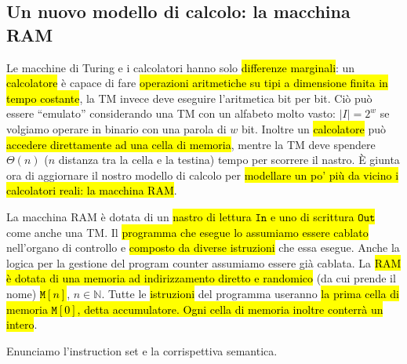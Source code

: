 \documentclass[a4paper,11pt,oneside]{article}
\theoremstyle{plain}
\theoremstyle{definition}
\theoremstyle{remark}
\begin{document}
\subsection{Un nuovo modello di calcolo: la macchina RAM}\label{sec:ram}

Le macchine di Turing e i calcolatori hanno solo \hl{differenze marginali}: un
\hl{calcolatore} è capace di fare \hl{operazioni aritmetiche su tipi a
dimensione finita in tempo costante}, la TM invece deve eseguire l'aritmetica
bit per bit. Ciò può essere ``emulato'' considerando una TM con un alfabeto
molto vasto: $|I| = 2^w$ se volgiamo operare in binario con una parola di $w$
bit. Inoltre un \hl{calcolatore} può \hl{accedere direttamente ad una cella di
memoria}, mentre la TM deve spendere $\Theta(n)$ ($n$ distanza tra la cella e la
testina) tempo per scorrere il nastro. È giunta ora di aggiornare il nostro
modello di calcolo per \hl{modellare un po' più da vicino i calcolatori reali:
la macchina RAM\@}.

La macchina RAM è dotata di un \hl{nastro di lettura $\mathtt{In}$ e uno di
scrittura $\mathtt{Out}$} come anche una TM\@. Il \hl{programma che esegue lo
assumiamo essere cablato} nell'organo di controllo e \hl{composto da diverse
istruzioni} che essa esegue. Anche la logica per la gestione del program counter
assumiamo essere già cablata. La \hl{RAM è dotata di una memoria ad
indirizzamento diretto e randomico} (da cui prende il nome)
\hl{$\mathtt{M}[n]$}, $n\in\mathbb{N}$. Tutte le \hl{istruzioni} del programma
useranno \hl{la prima cella di memoria $\mathtt{M}[0]$, detta accumulatore. Ogni
cella di memoria inoltre conterrà un intero}.

Enunciamo l'instruction set e la corrispettiva semantica.
\end{document}
